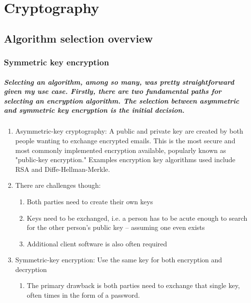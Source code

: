 
\chapter{Cryptography}

\section{Algorithm selection overview}

\subsection{Symmetric key encryption}
\paragraph{Selecting an algorithm, among so many, was pretty straightforward given my use case. Firstly, there are two fundamental paths for selecting an encryption algorithm. The selection between \emph{asymmetric} and \emph{symmetric} key encryption is the initial decision.}

\begin{enumerate}
\item Asymmetric-key cryptography: A public and private key are created by both people wanting to exchange encrypted emails. This is the most secure and most commonly implemented encryption available, popularly known as "public-key encryption." Examples encryption key algorithms used include RSA and Diffe-Hellman-Merkle. \cite[Website]{Shirey}
\item There are challenges though:
\begin{enumerate}
\item Both parties need to create their own keys
\item Keys need to be exchanged, i.e. a person has to be acute enough to search for the other person's public key -- assuming one even exists
\item Additional client software is also often required
\end{enumerate}
\item Symmetric-key encryption: Use the same key for both encryption and decryption \cite[p. 155]{DelfsKnebl}
\begin{enumerate}
\item The primary drawback is both parties need to exchange that single key, often times in the form of a password.
\end{enumerate}
\end{enumerate}

